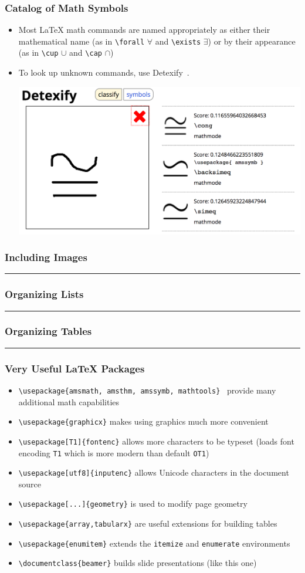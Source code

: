 \documentclass{beamer}
\newcommand{\samplerow}[2]{
	\begin{frame}
	\frametitle{#2}
	
	\hrule
	\vspace*{4pt}
	\begin{minipage}{\linewidth}
		
	\end{minipage}
	\end{frame}
}
\let\oldLaTeX\LaTeX
\renewcommand{\LaTeX}{\oldLaTeX\xspace}
\begin{document}
	\begin{frame}[fragile]
		\frametitle{Catalog of Math Symbols}
		\begin{itemize}
			\item Most \LaTeX math commands are named appropriately as either their mathematical name (as in \verb$\forall$ $\forall$ and \verb$\exists$ $\exists$) or by their appearance (as in \verb$\cup$ $\cup$ and \verb$\cap$ $\cap$)
			\item To look up unknown commands, use Detexify~\cite{detexify}.
			\begin{center}
				\includegraphics[width=0.7\linewidth]{Detexify}
			\end{center}
		\end{itemize}
	\end{frame}

	\samplerow{Image.tex}{Including Images}
	\samplerow{Lists.tex}{Organizing Lists}
	\samplerow{Table.tex}{Organizing Tables}

	\begin{frame}[fragile]
		\frametitle{Very Useful \LaTeX Packages}
		\begin{itemize}
			\item \verb$\usepackage{amsmath, amsthm, amssymb, mathtools}$~\cite{amsmath} provide many additional math capabilities
			\item \verb$\usepackage{graphicx}$ makes using graphics much more convenient
			\item \verb$\usepackage[T1]{fontenc}$ allows more characters to be typeset (loads font encoding \texttt{T1} which is more modern than default \texttt{OT1})
			\item \verb$\usepackage[utf8]{inputenc}$ allows Unicode characters in the document source
			\item \verb$\usepackage[...]{geometry}$ is used to modify page geometry
			\item \verb$\usepackage{array,tabularx}$ are useful extensions for building tables
			\item \verb$\usepackage{enumitem}$ extends the \texttt{itemize} and \texttt{enumerate} environments
			\item \verb$\documentclass{beamer}$ builds slide presentations (like this one)
		\end{itemize}
	\end{frame}
\end{document}
